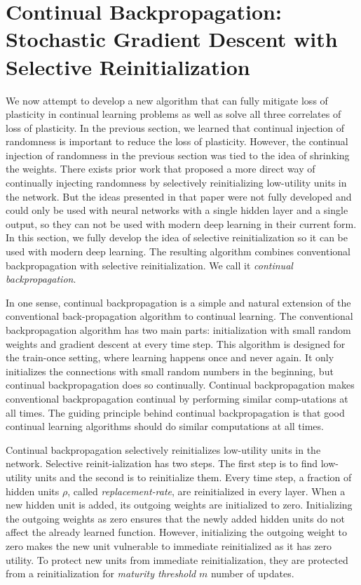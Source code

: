 \documentclass[review, number,3p]{elsarticle}
\begin{document}
\section{Continual Backpropagation: Stochastic Gradient Descent with Selective Reinitialization} 

We now attempt to develop a new algorithm that can fully mitigate loss of plasticity in continual learning problems as well as solve all three correlates of loss of plasticity.
In the previous section, we learned that continual injection of randomness is important to reduce the loss of plasticity.
However, the continual injection of randomness in the previous section was tied to the idea of shrinking the weights.
There exists prior work \cite{mahmood2013} that proposed a more direct way of continually injecting randomness by selectively reinitializing low-utility units in the network.
But the ideas presented in that paper were not fully developed and could only be used with neural networks with a single hidden layer and a single output, so they can not be used with modern deep learning in their current form.
In this section, we fully develop the idea of selective reinitialization so it can be used with modern deep learning.
The resulting algorithm combines conventional backpropagation with selective reinitialization.
We call it \textit{continual backpropagation}.

In one sense, continual backpropagation is a simple and natural extension of the conventional back-propagation algorithm to continual learning.
The conventional backpropagation algorithm has two main parts: initialization with small random weights and gradient descent at every time step. 
This algorithm is designed for the train-once setting, where learning happens once and never again.
It only initializes the connections with small random numbers in the beginning, but continual backpropagation does so continually.
Continual backpropagation makes conventional backpropagation continual by performing similar comp-utations at all times. 
The guiding principle behind continual backpropagation is that good continual learning algorithms should do similar computations at all times.

Continual backpropagation selectively reinitializes low-utility units in the network.
Selective reinit-ialization has two steps.
The first step is to find low-utility units and the second is to reinitialize them.
Every time step, a fraction of hidden units $\rho$, called \textit{replacement-rate}, are reinitialized in every layer. 
When a new hidden unit is added, its outgoing weights are initialized to zero.
Initializing the outgoing weights as zero ensures that the newly added hidden units do not affect the already learned function.
However, initializing the outgoing weight to zero makes the new unit vulnerable to immediate reinitialized as it has zero utility.
To protect new units from immediate reinitialization, they are protected from a reinitialization for \textit{maturity threshold} $m$ number of updates.
\end{document}
